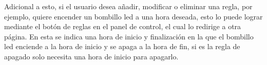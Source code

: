 Adicional a esto, si el usuario desea añadir, modificar o eliminar una regla, por ejemplo, quiere encender un bombillo led a una hora deseada, esto lo puede lograr mediante el botón de reglas en el panel de control, el cual lo redirige a otra página. En esta se indica una hora de inicio y finalización en la que el bombillo led enciende a la hora de inicio y se apaga a la hora de fin, si es la regla de apagado solo necesita una hora de inicio para apagarlo.\\
